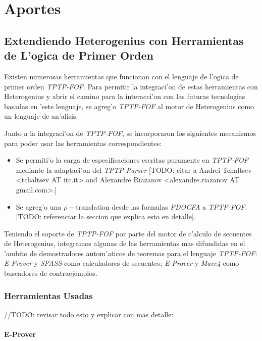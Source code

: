 \chapter{Aportes}


\section{Extendiendo Heterogenius con Herramientas de L'ogica de Primer Orden}

Existen numerosas herramientas que funcionan con el lenguaje de l'ogica de primer orden \textit{TPTP-FOF}. Para permitir la integraci'on de estas herramientas con Heterogenius y abrir el camino para la interacci'on con las futuras tecnologias basadas en 'este lenguaje, se agreg'o \textit{TPTP-FOF} al motor de Heterogenius como un lenguaje de an'alisis.

Junto a la integraci'on de \textit{TPTP-FOF}, se incorporaron los siguientes mecanismos para poder usar las herramientas correspondientes:

\begin{itemize}
\item Se permiti'o la carga de especificaciones escritas puramente en \textit{TPTP-FOF} mediante la adaptaci'on del \textit{TPTP-Parser} [TODO: citar a Andrei Tchaltsev <tchaltsev AT itc.it>
and Alexandre Riazanov <alexandre.riazanov AT gmail.com>.]

\item Se agreg'o una $\rho-$translation desde las formulas \textit{PDOCFA} a \textit{TPTP-FOF}. [TODO: referenciar la seccion que explica esto en detalle].

\end{itemize}

Teniendo el soporte de \textit{TPTP-FOF} por parte del motor de c'alculo de secuentes de Heterogenius, integramos algunas de las herramientas mas difundidas en el 'ambito de demostradores autom'aticos de teoremas para el lenguaje \textit{TPTP-FOF}: \textit{E-Prover} y \textit{SPASS} como calculadores de secuentes; \textit{E-Prover} y \textit{Mace4} como buscadores de contraejemplos.

\subsection{Herramientas Usadas}
//TODO: revisar todo esto y explicar con mas detalle:
\subsubsection{E-Prover}

